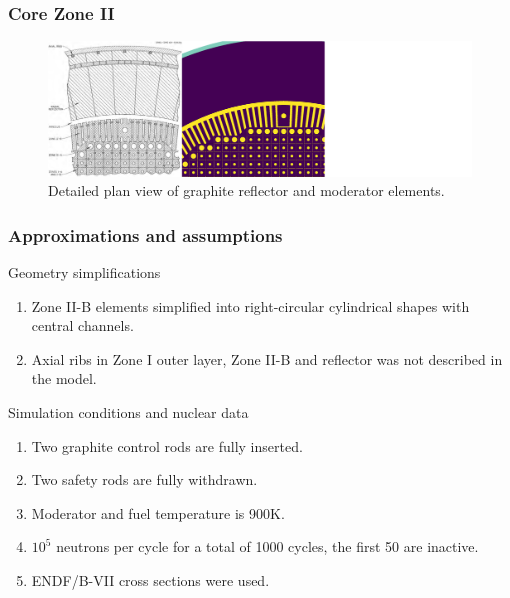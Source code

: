 \begin{frame}
  \frametitle{Core Zone II}
  \begin{figure}[t]
     \vspace{-0.25in}
       \hspace*{-0.43in}
       \includegraphics[height=0.77\textheight]{./images/reflector_and_elements.png}
            \caption{Detailed plan view of graphite reflector and moderator elements.}
  \end{figure}
           \vspace{-0.1in}
\end{frame}

\begin{frame}
  \frametitle{Approximations and assumptions}
              \begin{block}{Geometry simplifications}
               \begin{enumerate}
               \item Zone II-B elements simplified into right-circular
                 cylindrical shapes with central channels.
               \item Axial ribs in Zone I outer layer, Zone II-B and reflector was not
                 described in the model.
               \end{enumerate}
               \end{block}

               \begin{block}{Simulation conditions and nuclear data}
               \begin{enumerate}
               \item Two graphite control rods are fully inserted.
               \item Two safety rods are fully withdrawn.
               \item Moderator and fuel temperature is 900K.
               \item $10^5$ neutrons per cycle for a total of 1000 cycles,
                 the first 50 are inactive.
               \item ENDF/B-VII cross sections were used.
               \end{enumerate}
               \end{block}
\end{frame}


